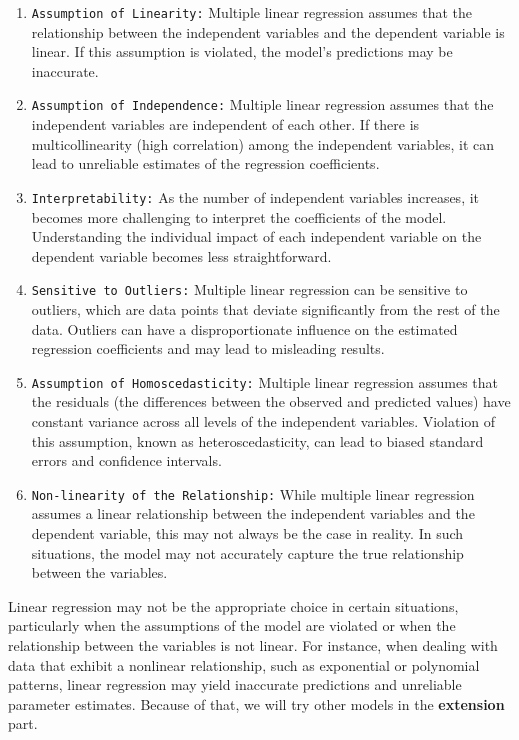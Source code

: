 \documentclass[a4paper]{article}
\theoremstyle{definition}
\begin{document}
\begin{enumerate}
    \item \verb|Assumption of Linearity:| Multiple linear regression assumes that the relationship between the independent variables and the dependent variable is linear. If this assumption is violated, the model's predictions may be inaccurate.
    \item \verb|Assumption of Independence:| Multiple linear regression assumes that the independent variables are independent of each other. If there is multicollinearity (high correlation) among the independent variables, it can lead to unreliable estimates of the regression coefficients.
    \item \verb|Interpretability:| As the number of independent variables increases, it becomes more challenging to interpret the coefficients of the model. Understanding the individual impact of each independent variable on the dependent variable becomes less straightforward.
    \item \verb|Sensitive to Outliers:| Multiple linear regression can be sensitive to outliers, which are data points that deviate significantly from the rest of the data. Outliers can have a disproportionate influence on the estimated regression coefficients and may lead to misleading results.
    \item \verb|Assumption of Homoscedasticity:| Multiple linear regression assumes that the residuals (the differences between the observed and predicted values) have constant variance across all levels of the independent variables. Violation of this assumption, known as heteroscedasticity, can lead to biased standard errors and confidence intervals.
    \item \verb|Non-linearity of the Relationship:| While multiple linear regression assumes a linear relationship between the independent variables and the dependent variable, this may not always be the case in reality. In such situations, the model may not accurately capture the true relationship between the variables.
\end{enumerate}

Linear regression may not be the appropriate choice in certain situations, particularly when the assumptions of the model are violated or when the relationship between the variables is not linear. For instance, when dealing with data that exhibit a nonlinear relationship, such as exponential or polynomial patterns, linear regression may yield inaccurate predictions and unreliable parameter estimates. Because of that, we will try other models in the \textbf{extension} part.
\end{document}
